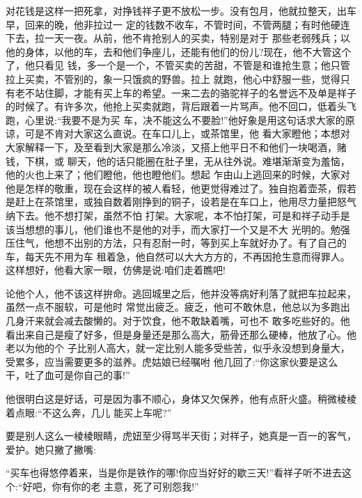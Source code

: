 \documentclass[11pt,a4paper,onecolumn]{article}
\begin{document}
对花钱是这样一把死拿，对挣钱祥子更不放松一步。没有包月，他就拉整天，出车早，回来的晚，他非拉过一
定的钱数不收车，不管时间，不管两腿；有时他硬连下去，拉一天一夜。从前，他不肯抢别人的买卖，特别是对于
那些老弱残兵；以他的身体，以他的车，去和他们争座儿，还能有他们的份儿?现在，他不大管这个了，他只看见
钱，多一个是一个，不管买卖的苦甜，不管是和谁抢生意；他只管拉上买卖，不管别的，象一只饿疯的野兽。拉上
就跑，他心中舒服一些，觉得只有老不站住脚，才能有买上车的希望。一来二去的骆驼祥子的名誉远不及单是祥子
的时候了。有许多次，他抢上买卖就跑，背后跟着一片骂声。他不回口，低着头飞跑，心里说:``我要不是为买
车，决不能这么不要脸!''他好象是用这句话求大家的原谅，可是不肯对大家这么直说。在车口儿上，或茶馆里，他
看大家瞪他；本想对大家解释一下，及至看到大家是那么冷淡，又搭上他平日不和他们一块喝酒，赌钱，下棋，或
聊天，他的话只能圈在肚子里，无从往外说。难堪渐渐变为羞恼，他的火也上来了；他们瞪他，他也瞪他们。想起
乍由山上逃回来的时候，大家对他是怎样的敬重，现在会这样的被人看轻，他更觉得难过了。独自抱着壶茶，假若
是赶上在茶馆里，或独自数着刚挣到的铜子，设若是在车口上，他用尽力量把怒气纳下去。他不想打架，虽然不怕
打架。大家呢，本不怕打架，可是和祥子动手是该当想想的事儿，他们谁也不是他的对手，而大家打一个又是不大
光明的。勉强压住气，他想不出别的方法，只有忍耐一时，等到买上车就好办了。有了自己的车，每天先不用为车
租着急，他自然可以大大方方的，不再因抢生意而得罪人。这样想好，他看大家一眼，仿佛是说:咱们走着瞧吧!

论他个人，他不该这样拚命。逃回城里之后，他并没等病好利落了就把车拉起来，虽然一点不服软，可是他时
常觉出疲乏。疲乏，他可不敢休息，他总以为多跑出几身汗来就会减去酸懒的。对于饮食，他不敢缺着嘴，可也不
敢多吃些好的。他看出来自己是瘦了好多，但是身量还是那么高大，筋骨还那么硬棒，他放了心。他老以为他的个
子比别人高大，就一定比别人能多受些苦，似乎永没想到身量大，受累多，应当需要更多的滋养。虎姑娘已经嘱咐
他几回了:``你这家伙要是这么干，吐了血可是你自己的事!''

他很明白这是好话，可是因为事不顺心，身体又欠保养，他有点肝火盛。稍微棱棱着点眼:``不这么奔，几儿
能买上车呢?''

要是别人这么一棱棱眼睛，虎妞至少得骂半天街；对祥子，她真是一百一的客气，爱护。她只撇了撇嘴:

``买车也得悠停着来，当是你是铁作的哪!你应当好好的歇三天!''看祥子听不进去这个:``好吧，你有你的老
主意，死了可别怨我!''
\end{document}
